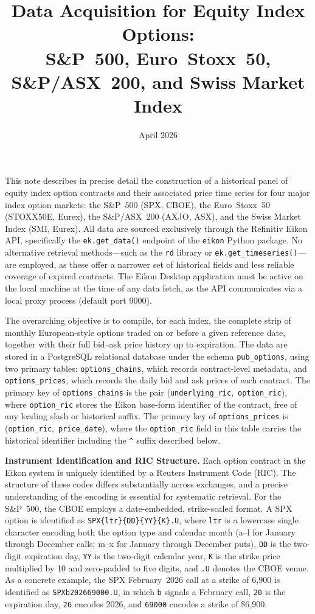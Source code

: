 \documentclass[12pt]{article}
\title{Data Acquisition for Equity Index Options:\\
S\&P~500, Euro~Stoxx~50, S\&P/ASX~200, and Swiss Market Index}
\author{}
\date{April 2026}
\begin{document}
\maketitle

\noindent
This note describes in precise detail the construction of a historical panel of
equity index option contracts and their associated price time series for four major
index option markets: the S\&P~500 (SPX, CBOE), the Euro~Stoxx~50 (STOXX50E,
Eurex), the S\&P/ASX~200 (AXJO, ASX), and the Swiss Market Index (SMI, Eurex).
All data are sourced exclusively through the Refinitiv Eikon API,
specifically the \texttt{ek.get\_data()} endpoint of the \texttt{eikon} Python
package. No alternative retrieval methods---such as the \texttt{rd} library or
\texttt{ek.get\_timeseries()}---are employed, as these offer a narrower set of
historical fields and less reliable coverage of expired contracts. The Eikon
Desktop application must be active on the local machine at the time of any data
fetch, as the API communicates via a local proxy process (default port 9000).

The overarching objective is to compile, for each index, the complete strip of
monthly European-style options traded on or before a given reference date,
together with their full bid--ask price history up to expiration. The data are
stored in a PostgreSQL relational database under the schema \texttt{pub\_options},
using two primary tables: \texttt{options\_chains}, which records contract-level
metadata, and \texttt{options\_prices}, which records the daily bid and ask prices
of each contract. The primary key of \texttt{options\_chains} is the pair
(\texttt{underlying\_ric},~\texttt{option\_ric}), where \texttt{option\_ric}
stores the Eikon base-form identifier of the contract, free of any leading slash
or historical suffix. The primary key of \texttt{options\_prices} is
(\texttt{option\_ric},~\texttt{price\_date}), where the \texttt{option\_ric}
field in this table carries the historical identifier including the
\texttt{\^{}} suffix described below.

\bigskip

\noindent\textbf{Instrument Identification and RIC Structure.}
Each option contract in the Eikon system is uniquely identified by a Reuters
Instrument Code (RIC). The structure of these codes differs substantially across
exchanges, and a precise understanding of the encoding is essential for
systematic retrieval. For the S\&P~500, the CBOE employs a
date-embedded, strike-scaled format. A SPX option is identified as
\texttt{SPX\{ltr\}\{DD\}\{YY\}\{K\}.U}, where \texttt{ltr} is a lowercase
single character encoding both the option type and calendar month (a--l for
January through December calls; m--x for January through December puts),
\texttt{DD} is the two-digit expiration day, \texttt{YY} is the two-digit
calendar year, \texttt{K} is the strike price multiplied by 10 and
zero-padded to five digits, and \texttt{.U} denotes the CBOE venue. As a
concrete example, the SPX February~2026 call at a strike of 6{,}900 is
identified as \texttt{SPXb202669000.U}, in which \texttt{b} signals a February
call, \texttt{20} is the expiration day, \texttt{26} encodes 2026, and
\texttt{69000} encodes a strike of \$6{,}900.
\end{document}
